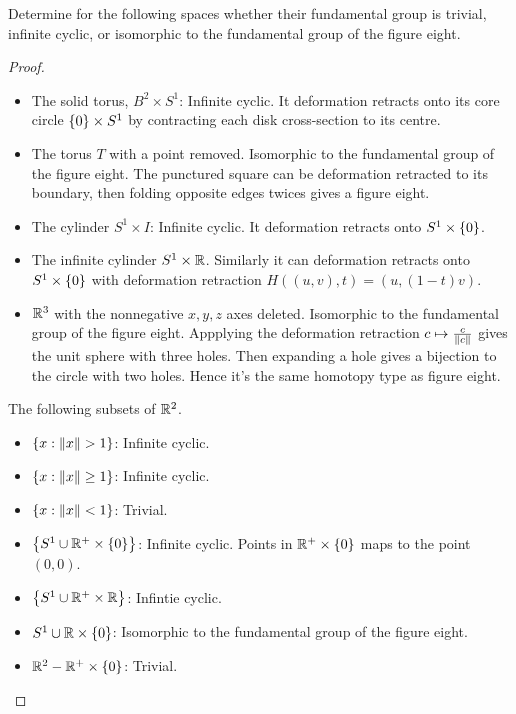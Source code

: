 \documentclass[12pt,a4paper]{article}
\begin{document}
    \begin{ex}
        Determine for the following spaces whether their fundamental group is trivial, infinite cyclic, or isomorphic to the fundamental group of the figure eight.
    \end{ex}
    \begin{proof}
        \begin{itemize}
            \item The solid torus, $B^2\times S^1$: Infinite cyclic. It deformation retracts onto its core circle $\left\{ 0 \right\}\times S^1$ by contracting each disk cross-section to its centre.
            \item The torus $T$ with a point removed. Isomorphic to the fundamental group of the figure eight. The punctured square can be deformation retracted to its boundary, then folding opposite edges twices gives a figure eight.
            \item The cylinder $S^1\times I$: Infinite cyclic. It deformation retracts onto $S^1\times\left\{ 0 \right\}$. 
            \item The infinite cylinder $S^1\times\mathbb{R}$. Similarly it can deformation retracts onto $S^1\times\left\{ 0 \right\}$ with deformation retraction $H((u,v),t)=(u,(1-t)v)$.
            \item $\mathbb{R}^3$ with the nonnegative $x,y,z$ axes deleted. Isomorphic to the fundamental group of the figure eight. Appplying the deformation retraction $c\mapsto\frac{c}{\left\lVert c \right\rVert}$ gives the unit sphere with three holes. Then expanding a hole gives a bijection to the circle with two holes. Hence it's the same homotopy type as figure eight.
        \end{itemize}
        
        The following subsets of $\mathbb{R}^2$.
        \begin{itemize}
            \item $\left\{ x:\left\lVert x \right\rVert>1 \right\}$: Infinite cyclic.
            \item $\left\{ x:\left\lVert x \right\rVert\geq1 \right\}$: Infinite cyclic.
            \item $\left\{ x:\left\lVert x \right\rVert<1 \right\}$: Trivial.
            \item $\left\{ S^1\cup\mathbb{R}^+\times\left\{ 0 \right\} \right\}$: Infinite cyclic. Points in $\mathbb{R}^+\times\left\{ 0 \right\}$ maps to the point $(0,0)$.
            \item $\left\{ S^1\cup\mathbb{R}^+\times\mathbb{R} \right\}$: Infintie cyclic.
            \item $S^1\cup\mathbb{R}\times\left\{ 0 \right\}$: Isomorphic to the fundamental group of the figure eight.
            \item $\mathbb{R}^2-\mathbb{R}^+\times\left\{ 0 \right\}$: Trivial.
        \end{itemize}
    \end{proof}
    \bigskip
\end{document}
